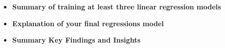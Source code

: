 \documentclass[12pt]{article}
\begin{document}
\begin{itemize}
\begin{enumerate}



    
    \end{enumerate}

\item \textbf{Summary of training at least three linear regression models}


\item \textbf{Explanation of your final regressions model}

\item \textbf{Summary Key Findings and Insights}


\end{itemize}
\end{document}
